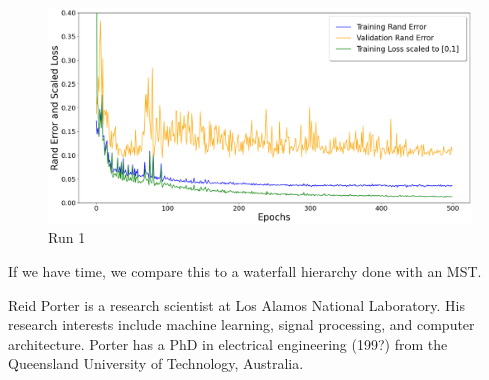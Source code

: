 \documentclass[letterpaper,twocolumn,fleqn]{article}
\begin{document}
\begin{figure}[h]
    \centering
    \includegraphics[height = 0.18\textheight]{run1crop.png}
    \caption{Run 1}
    \label{fig:run1}
\end{figure}



If we have time, we compare this to a waterfall hierarchy done with an MST.
  


\begin{biography}


Reid Porter is a research scientist at Los Alamos National Laboratory. His research interests include machine learning, signal processing, and computer architecture. Porter has a PhD in electrical engineering (199?) from the Queensland University of Technology, Australia.
\end{biography}
\end{document}
